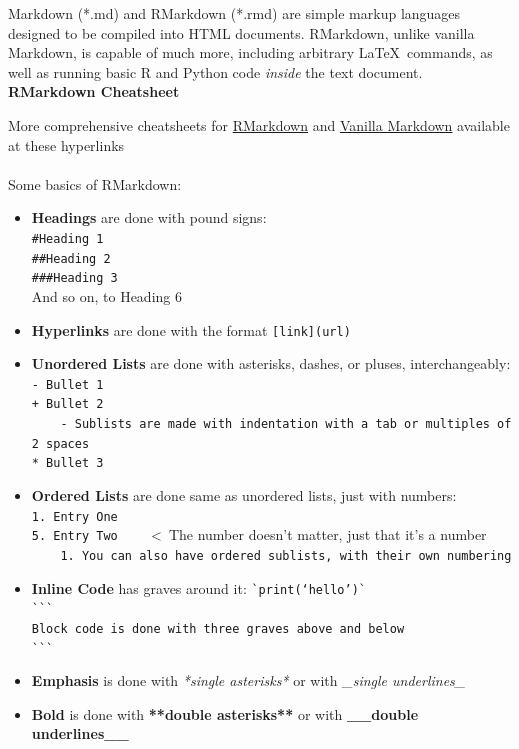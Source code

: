 \documentclass{article}
\begin{document}
Markdown (*.md) and RMarkdown (*.rmd) are simple markup languages designed to be compiled into HTML documents. RMarkdown, unlike vanilla Markdown, is capable of much more, including arbitrary \LaTeX \ commands, as well as running basic R and Python code \textit{inside} the text document.
\\

\noindent
\textbf{RMarkdown Cheatsheet}

More comprehensive cheatsheets for {\color{blue} \href{https://www.rstudio.com/wp-content/uploads/2015/02/rmarkdown-cheatsheet.pdf}{RMarkdown}} and {\color{blue} \href{https://github.com/adam-p/markdown-here/wiki/Markdown-Cheatsheet}{Vanilla Markdown}} available at these hyperlinks
\\
\\Some basics of RMarkdown:

\begin{itemize}
	\item \textbf{Headings} are done with pound signs:
		\\\texttt{\#Heading 1}
		\\\texttt{\#\#Heading 2}
		\\\texttt{\#\#\#Heading 3}
		\\And so on, to Heading 6
	\item \textbf{Hyperlinks} are done with the format \texttt{[link](url)}
	\item \textbf{Unordered Lists} are done with asterisks, dashes, or pluses, interchangeably:
		\\\texttt{- Bullet 1}
		\\\texttt{+ Bullet 2}
		\\\verb+    +\texttt{- Sublists are made with indentation with a tab or multiples of 2 spaces}
		\\\texttt{* Bullet 3}
	\item \textbf{Ordered Lists} are done same as unordered lists, just with numbers:
		\\\texttt{1.~Entry One}
		\\\texttt{5.~Entry Two} \verb+    +\textless \ The number doesn't matter, just that it's a number
		\\\verb+    +\texttt{1.~You can also have ordered sublists, with their own numbering}
	\item \textbf{Inline Code} has graves around it: \texttt{\`{}print(`hello')\`{}}
		\\\texttt{\`{}\`{}\`{}}
		\\\texttt{Block code is done with three graves above and below}
		\\\texttt{\`{}\`{}\`{}}
	\item \textbf{Emphasis} is done with \textit{*single asterisks*} or with \textit{\_single underlines\_}
	\item \textbf{Bold} is done with \textbf{**double asterisks**} or with \textbf{\_\_double underlines\_\_}
\end{itemize}
\end{document}
